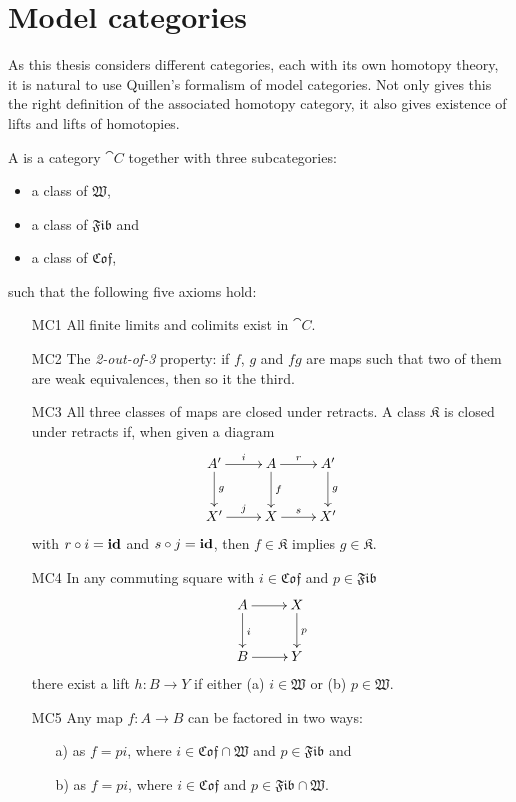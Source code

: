 
\chapter{Model categories}
\label{sec:model_categories}

As this thesis considers different categories, each with its own homotopy theory, it is natural to use Quillen's formalism of model categories. Not only gives this the right definition of the associated homotopy category, it also gives existence of lifts and lifts of homotopies.

\newcommand{\W}{\mathfrak{W}}
\newcommand{\Fib}{\mathfrak{Fib}}
\newcommand{\Cof}{\mathfrak{Cof}}

\begin{definition}
	A  is a category $\cat{C}$ together with three subcategories:
	\begin{itemize}\itemsep0em
		\item a class of  $\W$,
		\item a class of  $\Fib$ and
		\item a class of  $\Cof$,
	\end{itemize}
	such that the following five axioms hold:
	\begin{itemize}\itemsep0em
		\item[MC1] All finite limits and colimits exist in $\cat{C}$.
		\item[MC2] The \emph{2-out-of-3} property: if $f$, $g$ and $fg$ are maps such that two of them are weak equivalences, then so it the third.
		\item[MC3] All three classes of maps are closed under retracts. A class $\mathfrak{K}$ is closed under retracts if, when given a diagram
		\[\xymatrix {
			A' \ar[r]^-i \ar[d]^-g & A \ar[r]^-r \ar[d]^-f & A' \ar[d]^-g \\
			X' \ar[r]^-j & X \ar[r]^-s & X'
		} \]
		with $r \circ i = \mathbf{id}$ and $s \circ j = \mathbf{id}$, then $f \in \mathfrak{K}$ implies $g \in \mathfrak{K}$.
		\item[MC4] In any commuting square with $i \in \Cof$ and $p \in \Fib$
			\[\xymatrix {
				A \ar[d]^i \ar[r] & X \ar[d]^p \\
				B \ar[r] & Y
			}\]
			there exist a lift $h: B \to Y$ if either (a) $i \in \W$ or (b) $p \in \W$.
		\item[MC5] Any map $f : A \to B$ can be factored in two ways:
			\begin{itemize}
				\item[a)] as $f = pi$, where $i \in \Cof \cap \W$ and $p \in \Fib$ and
				\item[b)] as $f = pi$, where $i \in \Cof$ and $p \in \Fib \cap \W$.
			\end{itemize}
	\end{itemize}
\end{definition}

